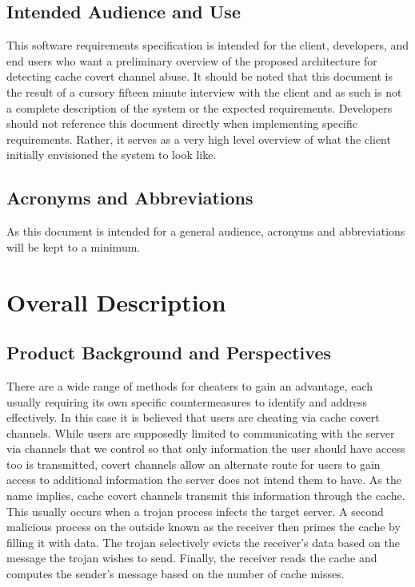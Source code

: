 \documentclass[12pt]{article}
\begin{document}
\subsection{Intended Audience and Use}

This software requirements specification is intended for the client, developers, and end users who want
a preliminary overview of the proposed architecture for detecting cache covert channel abuse. It should
be noted that this document is the result of a cursory fifteen minute interview with the client and as
such is not a complete description of the system or the expected requirements. Developers should not
reference this document directly when implementing specific requirements. Rather, it serves as a very
high level overview of what the client initially envisioned the system to look like.

\subsection{Acronyms and Abbreviations}

As this document is intended for a general audience, acronyms and abbreviations will be kept to a minimum.

\section{Overall Description}

\subsection{Product Background and Perspectives}

There are a wide range of methods for cheaters to gain an advantage, each usually requiring its own specific
countermeasures to identify and address effectively. In this case it is believed that users are cheating via
cache covert channels. While users are supposedly limited to communicating with the server via channels that
we control so that only information the user should have access too is transmitted, covert channels allow an
alternate route for users to gain access to additional information the server does not intend them to have.
As the name implies, cache covert channels transmit this information through the cache. This usually occurs
when a trojan process infects the target server. A second malicious process on the outside known as the receiver
then primes the cache by filling it with data. The trojan selectively evicts the receiver’s data based on the
message the trojan wishes to send. Finally, the receiver reads the cache and computes the sender’s message
based on the number of cache misses.
\end{document}
